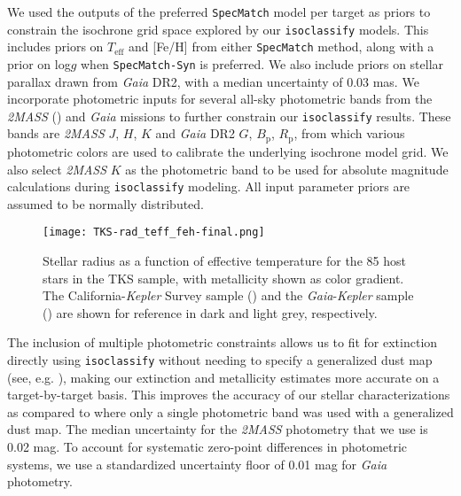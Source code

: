 \documentclass[twocolumn]{aastex63}
\begin{document}
We used the outputs of the preferred \texttt{SpecMatch} model per target as priors to constrain the isochrone grid space explored by our \texttt{isoclassify} models. This includes priors on $T_\textrm{eff}$ and [Fe/H] from either \texttt{SpecMatch} method, along with a prior on log$g$ when \texttt{SpecMatch-Syn} is preferred. We also include priors on stellar parallax drawn from \textit{Gaia} DR2, with a median uncertainty of 0.03 mas. We incorporate photometric inputs for several all-sky photometric bands from the \textit{2MASS} (\citealt{Skrutskie06}) and \textit{Gaia} missions to further constrain our \texttt{isoclassify} results. These bands are \textit{2MASS} $J$, $H$, $K$ and \textit{Gaia} DR2 $G$, $B_\textrm{p}$, $R_\textrm{p}$, from which various photometric colors are used to calibrate the underlying isochrone model grid. We also select \textit{2MASS} $K$ as the photometric band to be used for absolute magnitude calculations during \texttt{isoclassify} modeling. All input parameter priors are assumed to be normally distributed.

\begin{figure}[ht]
\centering
\texttt{[image: TKS-rad\_teff\_feh-final.png]}
\caption{Stellar radius as a function of effective temperature for the 85 host stars in the TKS sample, with metallicity shown as color gradient. The California-\emph{Kepler} Survey sample (\citealt{Petigura22}) and the \emph{Gaia}-\emph{Kepler} sample (\citealt{Berger20}) are shown for reference in dark and light grey, respectively.}
\label{fig:rad-teff-feh}
\end{figure}

The inclusion of multiple photometric constraints allows us to fit for extinction directly using \texttt{isoclassify} without needing to specify a generalized dust map (see, e.g. \citealt{Lallement19}), making our extinction and metallicity estimates more accurate on a target-by-target basis. This improves the accuracy of our stellar characterizations as compared to \cite{Chontos22} where only a single photometric band was used with a generalized dust map. The median uncertainty for the \textit{2MASS} photometry that we use is 0.02 mag. To account for systematic zero-point differences in photometric systems, we use a standardized uncertainty floor of 0.01 mag for \textit{Gaia} photometry.
\end{document}
